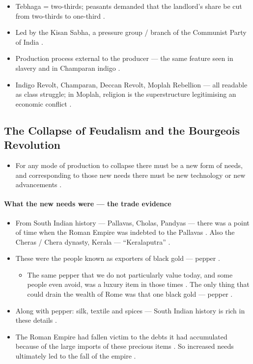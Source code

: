 \begin{QuickRevision}
\begin{itemize}
    \item Tebhaga = two-thirds; peasants demanded that the landlord's share be cut from two-thirds to one-third .
    \item Led by the Kisan Sabha, a pressure group / branch of the Communist Party of India .
    \item Production process external to the producer --- the same feature seen in slavery and in Champaran indigo .
    \item Indigo Revolt, Champaran, Deccan Revolt, Moplah Rebellion --- all readable as class struggle; in Moplah, religion is the superstructure legitimising an economic conflict .
\end{itemize}
\end{QuickRevision}

\subsection{The Collapse of Feudalism and the Bourgeois Revolution}
\begin{itemize}
    \item For any mode of production to collapse there must be a new form of needs, and corresponding to those new needs there must be new technology or new advancements .
\end{itemize}

\paragraph{What the new needs were --- the trade evidence}
\begin{itemize}
    \item From South Indian history --- Pallavas, Cholas, Pandyas --- there was a point of time when the Roman Empire was indebted to the Pallavas . Also the Cheras / Chera dynasty, Kerala --- ``Keralaputra'' .
    \item These were the people known as exporters of black gold --- pepper .
    \begin{itemize}
        \item The same pepper that we do not particularly value today, and some people even avoid, was a luxury item in those times . The only thing that could drain the wealth of Rome was that one black gold --- pepper .
    \end{itemize}
    \item Along with pepper: silk, textile and spices --- South Indian history is rich in these details .
    \item The Roman Empire had fallen victim to the debts it had accumulated because of the large imports of these precious items . So increased needs ultimately led to the fall of the empire .
\end{itemize}

